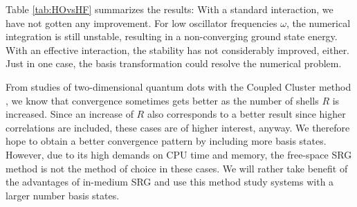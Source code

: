 \begin{table}
\begin{center}

\end{center}
\caption{Runs not converging with a harmonic oscillator (HO) basis are repeated with a Hartree-Fock (HF) basis. For the converging cases, the ground state energy $E_0$ is given in $\left[E_H\right]$.}
\label{tab:HOvsHF}
\end{table}

Table \ref{tab:HOvsHF} summarizes the results: With a standard interaction, we have not gotten any improvement. For low oscillator frequencies $\omega$, the numerical integration is still unstable, resulting in a non-converging ground state energy. With an effective interaction, the stability has not considerably improved, either. Just in one case, the basis transformation could resolve the numerical problem.

From studies of two-dimensional quantum dots with the Coupled Cluster method \cite{Marte,Christoffer,Lohne}, we know that convergence sometimes gets better as the number of shells $R$ is increased. Since an increase of $R$ also corresponds to a better result since higher correlations are included, these cases are of higher interest, anyway. We therefore hope to obtain a better convergence pattern by including more basis states. However, due to its high demands on CPU time and memory, the free-space SRG method is not the method of choice in these cases. We will rather take benefit of the advantages of in-medium SRG and use this method study systems with a larger number basis states.


